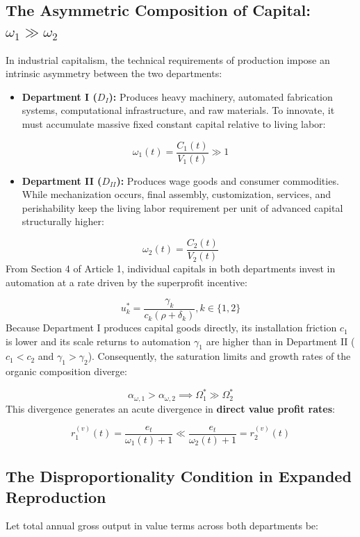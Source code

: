 \documentclass[11pt,letterpaper]{report}
\begin{document}
\subsection{The Asymmetric Composition of Capital: ${\omega }_{1}\gg {\omega }_{2}$}
In industrial capitalism, the technical requirements of production impose an intrinsic asymmetry between the two departments:

\begin{itemize}
\item \textbf{Department I (${D}_{I}$):} Produces heavy machinery, automated fabrication systems, computational infrastructure, and raw materials. To innovate, it must accumulate massive fixed constant capital relative to living labor:
\end{itemize}
\[
{\omega }_{1}(t)=\frac{{C}_{1}(t)}{{V}_{1}(t)}\gg 1
\]
\begin{itemize}
\item \textbf{Department II (${D}_{II}$):} Produces wage goods and consumer commodities. While mechanization occurs, final assembly, customization, services, and perishability keep the living labor requirement per unit of advanced capital structurally higher:
\end{itemize}
\[
{\omega }_{2}(t)=\frac{{C}_{2}(t)}{{V}_{2}(t)}
\]
From Section 4 of Article 1, individual capitals in both departments invest in automation at a rate driven by the superprofit incentive:

\[
{u}_{k}^{*}=\frac{{\gamma }_{k}}{{c}_{k}(\rho +{\delta }_{k})},k\in \{1,2\}
\]
Because Department I produces capital goods directly, its installation friction ${c}_{1}$ is lower and its scale returns to automation ${\gamma }_{1}$ are higher than in Department II (${c}_{1}<{c}_{2}$ and ${\gamma }_{1}>{\gamma }_{2}$). Consequently, the saturation limits and growth rates of the organic composition diverge:

\[
\alpha_{\omega, 1} > \alpha_{\omega, 2} \implies \Omega_1^* \gg \Omega_2^*
\]
This divergence generates an acute divergence in \textbf{direct value profit rates}:

\[
{r}_{1}^{(v)}(t)=\frac{{e}_{t}}{{\omega }_{1}(t)+1}\ll \frac{{e}_{t}}{{\omega }_{2}(t)+1}={r}_{2}^{(v)}(t)
\]
\subsection{The Disproportionality Condition in Expanded Reproduction}
Let total annual gross output in value terms across both departments be:
\end{document}
